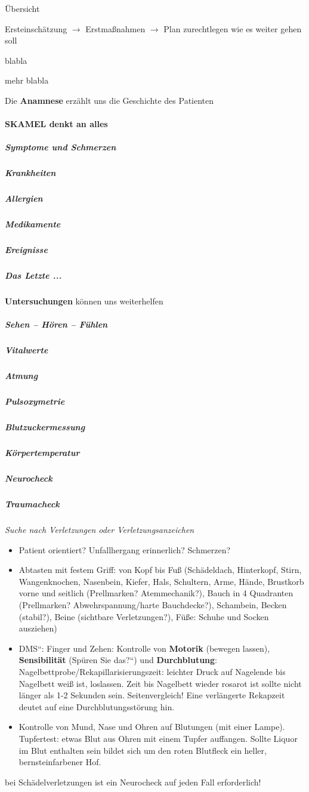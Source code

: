 \documentclass{article}
\newcommand\gEs[1]{\textbf{\textcolor[rgb]{0.0,0.0,0.5019608}{#1}}}
\newcommand\gEs[1]{\textbf{\textcolor[rgb]{0.0,0.0,0.5019608}{#1}}}
\begin{document}
\"Ubersicht 

Ersteinsch\"atzung ${\rightarrow}$  Erstma{\ss}nahmen ${\rightarrow}$ 
Plan zurechtlegen wie es weiter gehen soll

{\mdseries
blabla}

{\mdseries
mehr blabla}

{\mdseries\color[rgb]{0.0,0.0,0.5019608}
Die \gEs{Anamnese} erz\"ahlt uns die Geschichte des
Patienten}

\paragraph{S{\textquotesingle}KAMEL denkt an alles}
\subparagraph{Symptome und Schmerzen}
\subparagraph{Krankheiten}
\subparagraph{Allergien}
\subparagraph{Medikamente}
\subparagraph{Ereignisse}
\subparagraph{Das Letzte ...}
{\mdseries\color[rgb]{0.0,0.0,0.5019608}
\gEs{Untersuchungen} k\"onnen uns weiterhelfen}

\subparagraph{Sehen -- H\"oren -- F\"uhlen }
\subparagraph{Vitalwerte}
\subparagraph{Atmung}
\subparagraph{Pulsoxymetrie}
\subparagraph{Blutzuckermessung}
\subparagraph{K\"orpertemperatur}
\subparagraph{Neurocheck}
\subparagraph{Traumacheck}
{\itshape
Suche nach Verletzungen oder Verletzungsanzeichen}

\begin{itemize}
\item {
Patient orientiert? Unfallhergang erinnerlich? Schmerzen?}

\end{itemize}
\begin{itemize}
\item {
Abtasten mit festem Griff: von Kopf bis Fu{\ss} (Sch\"adeldach,
Hinterkopf, Stirn, Wangenknochen, Nasenbein, Kiefer, Hals, Schultern,
Arme, H\"ande, Brustkorb vorne und seitlich (Prellmarken?
Atemmechanik?), Bauch in 4 Quadranten (Prellmarken?
Abwehrspannung/harte Bauchdecke?), Schambein, Becken (stabil?), Beine
(sichtbare Verletzungen?), F\"u{\ss}e: Schuhe und Socken ausziehen)}

\item {
{\quotedblbase}DMS{\textquotedblleft}: Finger und Zehen: Kontrolle von
\textbf{Motorik} (bewegen lassen), \textbf{Sensibilit\"at}
({\quotedblbase}Sp\"uren Sie das?{\textquotedblleft}) und
\textbf{Durchblutung}: Nagelbettprobe/Rekapillarisierungszeit: leichter
Druck auf Nagelende bis Nagelbett wei{\ss} ist, loslassen. Zeit bis
Nagelbett wieder rosarot ist sollte nicht l\"anger als 1-2 Sekunden
sein. Seitenvergleich! Eine verl\"angerte Rekapzeit deutet auf eine
Durchblutungsst\"orung hin.}

\item {
Kontrolle von Mund, Nase und Ohren auf Blutungen (mit einer Lampe).
Tupfertest: etwas Blut aus Ohren mit einem Tupfer auffangen. Sollte
Liquor im Blut enthalten sein bildet sich um den roten Blutfleck ein
heller, bernsteinfarbener Hof.}

\end{itemize}
{
bei Sch\"adelverletzungen ist ein Neurocheck auf jeden Fall
erforderlich!}
\end{document}
